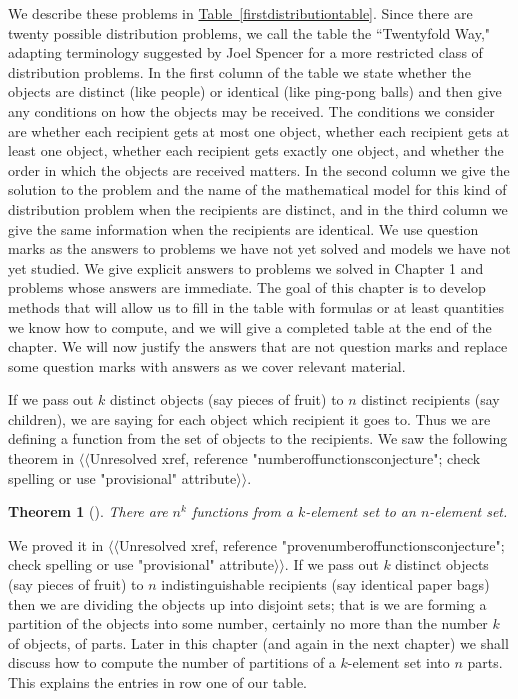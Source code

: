\documentclass[10pt,]{book}
\theoremstyle{plain}
\newtheorem{theorem}{Theorem}[section]
\theoremstyle{definition}
\numberwithin{equation}{chapter}
\begin{document}
We describe these problems in \hyperref[firstdistributiontable]{Table~\ref{firstdistributiontable}}. Since there are twenty possible distribution problems, we call the table the ``Twentyfold Way," adapting terminology suggested by Joel Spencer for a more restricted class of distribution problems. In the first column of the table we state whether the objects are distinct (like people) or identical (like ping-pong balls) and then give any conditions on how the objects may be received. The conditions we consider are whether each recipient gets at most one object, whether each recipient gets at least one object, whether each recipient gets exactly one object, and whether the order in which the objects are received matters. In the second column we give the solution to the problem and the name of the mathematical model for this kind of distribution problem when the recipients are distinct, and in the third column we give the same information when the recipients are identical. We use question marks as the answers to problems we have not yet solved and models we have not yet studied. We give explicit answers to problems we solved in Chapter 1 and problems whose answers are immediate. The goal of this chapter is to develop methods that will allow us to fill in the table with formulas or at least quantities we know how to compute, and we will give a completed table at the end of the chapter. We will now justify the answers that are not question marks and replace some question marks with answers as we cover relevant material.%
\par
If we pass out \(k\) distinct objects (say pieces of fruit) to \(n\) distinct recipients (say children), we are saying for each object which recipient it goes to. Thus we are defining a function from the set of objects to the recipients. We saw the following theorem in {$\langle\langle$Unresolved xref, reference "numberoffunctionsconjecture"; check spelling or use "provisional" attribute$\rangle\rangle$}.%
\begin{theorem}[{}]\label{theorem-1}
There are \(n^k\) functions from a \(k\)-element set to an \(n\)-element set.%
\end{theorem}
We proved it in {$\langle\langle$Unresolved xref, reference "provenumberoffunctionsconjecture"; check spelling or use "provisional" attribute$\rangle\rangle$}. If we pass out \(k\) distinct objects (say pieces of fruit) to \(n\) indistinguishable recipients (say identical paper bags) then we are dividing the objects up into disjoint sets; that is we are forming a partition of the objects into some number, certainly no more than the number \(k\) of objects, of parts. Later in this chapter (and again in the next chapter) we shall discuss how to compute the number of partitions of a \(k\)-element set into \(n\) parts. This explains the entries in row one of our table.%
\end{document}
